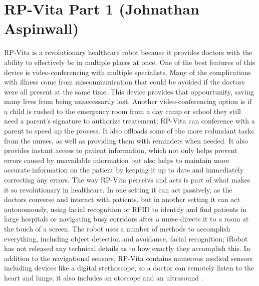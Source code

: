 \documentclass[11pt,conference]{IEEEtran}
\begin{document}
\section{RP-Vita Part 1 (Johnathan Aspinwall)}

RP-Vita is a revolutionary healthcare robot because it provides doctors with the ability to effectively be in multiple places at once. One of the best features of this device is video-conferencing with multiple specialists. Many of the complications with illness come from miscommunication that could be avoided if the doctors were all present at the same time. This device provides that oppourtunity, saving many lives from being unnecessarily lost. Another video-conferencing option is if a child is rushed to the emergency room from a day camp or school they still need a parent's signature to authorize treatement; RP-Vita can conference with a parent to speed up the process. It also offloads some of the more redundant tasks from the nurses, as well as providing them with reminders when needed. It also provides instant access to patient information, which not only helps prevent errors caused by unavailable information but also helps to maintain more accurate information on the patient by keeping it up to date and immediately correcting any errors. \cite{irobot}
\newline
\indent The way RP-Vita perceivs and acts is part of what makes it so revolutionary in healthcare. In one setting it can act passively, as the doctors converse and interact with patients, but in another setting it can act autonomously, using facial recognition or RFID to identify and find patients in large hospitals or navigating busy corridors after a nurse directs it to a room at the touch of a screen. The robot uses a number of methods to accomplish everything, including object detection and avoidance, facial recognition; iRobot has not released any technical details as to how exactly they accomplish this. In addition to the navigational sensors, RP-Vita contains numerous medical sensors including devices like a digital stethoscope, so a doctor can remotely listen to the heart and lungs; it also includes an otoscope and an ultrasound \cite{spectrum}.

\end{document}
